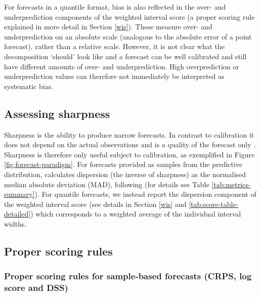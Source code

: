 \documentclass[
]{jss}
\begin{document}
For forecasts in a quantile format, bias is also reflected in the over-
and underprediction components of the weighted interval score (a proper
scoring rule explained in more detail in Section \ref{wis}). These
measure over- and underprediction on an absolute scale (analogous to the
absolute error of a point forecast), rather than a relative scale.
However, it is not clear what the decomposition `should' look like and a
forecast can be well calibrated and still have different amounts of
over- and underprediction. High overprediction or underprediction values
can therefore not immediately be interpreted as systematic bias.

\hypertarget{assessing-sharpness}{%
\subsection{Assessing sharpness}\label{assessing-sharpness}}

Sharpness is the ability to produce narrow forecasts. In contrast to
calibration it does not depend on the actual observations and is a
quality of the forecast only
\citep{gneitingProbabilisticForecastsCalibration2007}. Sharpness is
therefore only useful subject to calibration, as exemplified in Figure
\ref{fig:forecast-paradigm}. For forecasts provided as samples from the
predictive distribution,  calculates dispersion (the
inverse of sharpness) as the normalised median absolute deviation (MAD),
following \cite{funkAssessingPerformanceRealtime2019} (for details see
Table \ref{tab:metrics-summary}). For quantile forecasts, we instead
report the dispersion component of the weighted interval score (see
details in Section \ref{wis} and \ref{tab:score-table-detailed}) which
corresponds to a weighted average of the individual interval widths.

\hypertarget{proper-scoring-rules}{%
\subsection{Proper scoring rules}\label{proper-scoring-rules}}

\hypertarget{proper-scoring-rules-for-sample-based-forecasts-crps-log-score-and-dss}{%
\subsubsection{Proper scoring rules for sample-based forecasts (CRPS,
log score and
DSS)}\label{proper-scoring-rules-for-sample-based-forecasts-crps-log-score-and-dss}}
\end{document}
